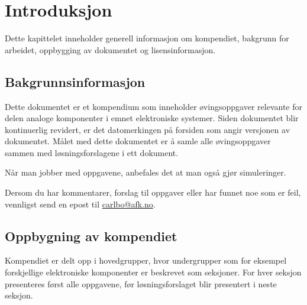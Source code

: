 \chapter{Introduksjon}
\label{ch:introduksjon}
Dette kapittelet inneholder generell informasjon om kompendiet, bakgrunn for arbeidet, oppbygging av dokumentet og lisensinformasjon.

\section{Bakgrunnsinformasjon}
Dette dokumentet er et kompendium som inneholder øvingsoppgaver relevante for delen analoge komponenter i emnet elektroniske systemer. Siden dokumentet blir kontinuerlig revidert, er det datomerkingen på forsiden som angir versjonen av dokumentet. Målet med dette dokumentet er å samle alle øvingsoppgaver sammen med løsningsforslagene i ett dokument.

Når man jobber med oppgavene, anbefales det at man også gjør simuleringer. %

Dersom du har kommentarer, forslag til oppgaver eller har funnet noe som er feil, vennligst send en epost til \href{mailto:carlbo@afk.no}{carlbo@afk.no}.

\section{Oppbygning av kompendiet}
Kompendiet er delt opp i hovedgrupper, hvor undergrupper som for eksempel forskjellige elektroniske komponenter er beskrevet som seksjoner. For hver seksjon presenteres først alle oppgavene, før løsningsforslaget blir presentert i neste seksjon.

\begin{comment}
	\section{Lisensinformasjon}
	Dette dokumentet er basert på materiale fra \textit{Lessons In Electric Circuits} av Tony R. Kuphaldt, distribuert under Design Science License. Originaldokumentet kan finnes på \href{https://www.ibiblio.org/kuphaldt/electricCircuits/}{Lessons In Electric Circuits}. Eventuelle modifikasjoner og avledede verk er også distribuert under Design Science License.
	
	Deler av dette kompendiet er utviklet av Carl Magnus Bøe. Disse delene inkluderer:
	\begin{enumerate}[label=\roman*)]
		\item Kapittel \ref{sec:diodeOppgave} / \ref{sec:diodeLøsning}
		\item 
	\end{enumerate}
\end{comment}